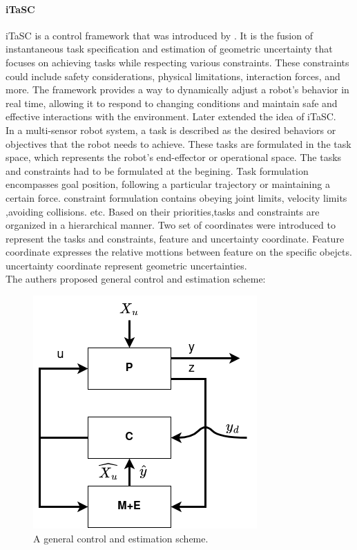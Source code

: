 \documentclass[report.tex]{subfiles}
\begin{document}
    \paragraph*{\large{iTaSC}\\}
    iTaSC is a control framework that was introduced by \cite{smits2008itasc}. It is the fusion of instantaneous task specification and estimation of geometric uncertainty that focuses on achieving tasks while respecting various constraints. These constraints could include safety considerations, physical limitations, interaction forces, and more. The framework provides a way to dynamically adjust a robot's behavior in real time, allowing it to respond to changing conditions and maintain safe and effective interactions with the environment. Later \cite{decre2009extending} extended the idea of iTaSC.\\
    In a multi-sensor robot system, a task is described as the desired behaviors or objectives that the robot needs to achieve. These tasks are formulated in the task space, which represents the robot's end-effector or operational space. The tasks and constraints had to be formulated at the begining. Task formulation encompasses goal position, following a particular trajectory or maintaining a certain force. constraint formulation contains obeying joint limits, velocity limits ,avoiding collisions. etc. Based on their priorities,tasks and constraints are organized in a hierarchical manner. Two set of coordinates were introduced to represent the tasks and constraints, feature and uncertainty coordinate. Feature coordinate expresses the relative mottions between feature on the specific obejcts. uncertainty coordinate represent geometric uncertainties.\\
    The authers proposed general control and estimation scheme:
    \begin{figure}[h!]
        \centering
        \includegraphics[width=0.4\linewidth]{images/iTaSC.png}
        \caption{A general control and estimation scheme.\cite{smits2008itasc}}
        \label{fig:itasc}
    \end{figure}
\end{document}
